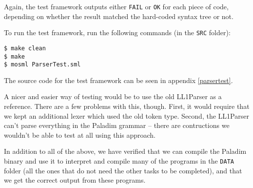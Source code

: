 \documentclass{article}
\begin{document}
Again, the test framework outputs either \texttt{FAIL} or \texttt{OK} for each piece of code,
depending on whether the result matched the hard-coded syntax tree or not.

To run the test framework, run the following commands (in the \texttt{SRC} folder):

\begin{verbatim}
$ make clean
$ make
$ mosml ParserTest.sml
\end{verbatim}

The source code for the test framework can be seen in appendix \ref{parsertest}.

A nicer and easier way of testing would be to use the old LL1Parser as a reference. There are
a few problems with this, though. First, it would require that we kept an additional lexer
which used the old token type. Second, the LL1Parser can't parse everything in the Paladim
grammar -- there are contructions we wouldn't be able to test at all using this approach.

In addition to all of the above, we have verified that we can compile the Paladim binary and
use it to interpret and compile many of the programs in the \texttt{DATA} folder (all the
ones that do not need the other tasks to be completed), and that we get the correct output
from these programs.
\end{document}
